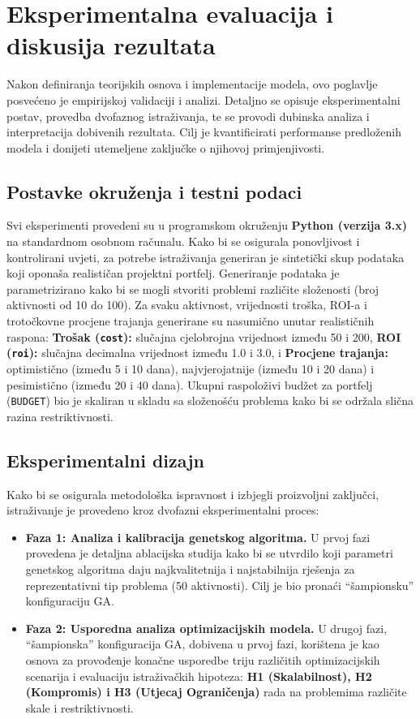 \section{Eksperimentalna evaluacija i diskusija rezultata}
\label{chap:eksperimenti}
Nakon definiranja teorijskih osnova i implementacije modela, ovo poglavlje posvećeno je empirijskoj validaciji i analizi. Detaljno se opisuje eksperimentalni postav, provedba dvofaznog istraživanja, te se provodi dubinska analiza i interpretacija dobivenih rezultata. Cilj je kvantificirati performanse predloženih modela i donijeti utemeljene zaključke o njihovoj primjenjivosti.

\subsection{Postavke okruženja i testni podaci}
Svi eksperimenti provedeni su u programskom okruženju \textbf{Python (verzija 3.x)} na standardnom osobnom računalu. Kako bi se osigurala ponovljivost i kontrolirani uvjeti, za potrebe istraživanja generiran je sintetički skup podataka koji oponaša realističan projektni portfelj.  Generiranje podataka je parametrizirano kako bi se mogli stvoriti problemi različite složenosti (broj aktivnosti od 10 do 100). Za svaku aktivnost, vrijednosti troška, ROI-a i trotočkovne procjene trajanja generirane su nasumično unutar realističnih raspona: \textbf{Trošak (\texttt{cost}):} slučajna cjelobrojna vrijednost između 50 i 200, \textbf{ROI (\texttt{roi}):} slučajna decimalna vrijednost između 1.0 i 3.0, i \textbf{Procjene trajanja:} optimistično (između 5 i 10 dana), najvjerojatnije (između 10 i 20 dana) i pesimistično (između 20 i 40 dana).
Ukupni raspoloživi budžet za portfelj (\texttt{BUDGET}) bio je skaliran u skladu sa složenošću problema kako bi se održala slična razina restriktivnosti.

\subsection{Eksperimentalni dizajn}
Kako bi se osigurala metodološka ispravnost i izbjegli proizvoljni zaključci, istraživanje je provedeno kroz dvofazni eksperimentalni proces:
\begin{itemize}
    \item \textbf{Faza 1: Analiza i kalibracija genetskog algoritma.} U prvoj fazi provedena je detaljna ablacijska studija kako bi se utvrdilo koji parametri genetskog algoritma daju najkvalitetnija i najstabilnija rješenja za reprezentativni tip problema (50 aktivnosti). Cilj je bio pronaći ``šampionsku'' konfiguraciju GA.
    \item \textbf{Faza 2: Usporedna analiza optimizacijskih modela.} U drugoj fazi, ``šampionska'' konfiguracija GA, dobivena u prvoj fazi, korištena je kao osnova za provođenje konačne usporedbe triju različitih optimizacijskih scenarija i evaluaciju istraživačkih hipoteza: \textbf{H1 (Skalabilnost), H2 (Kompromis) i H3 (Utjecaj Ograničenja)} rada na problemima različite skale i restriktivnosti.
\end{itemize}

